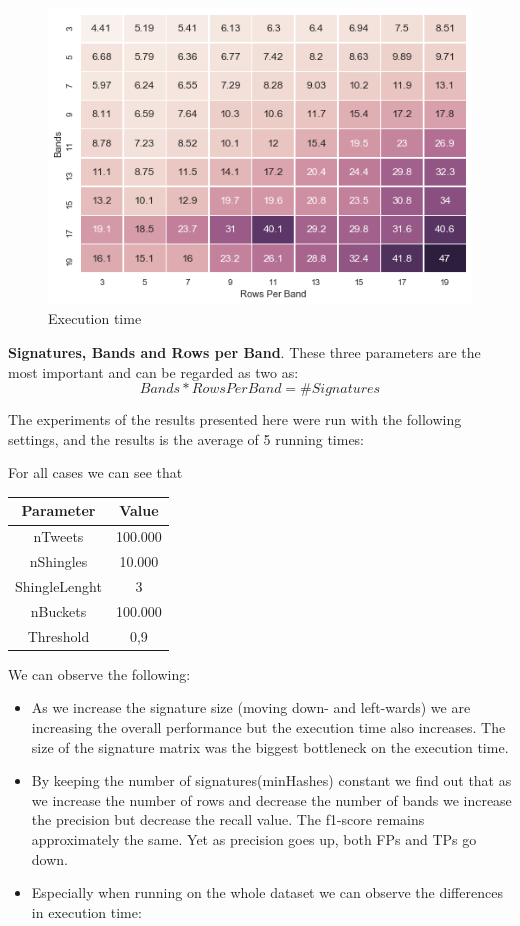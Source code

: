 \documentclass[12pt]{article}
\begin{document}
\begin{figure}[t]
\caption{Execution time}
\includegraphics[scale=0.7]{time.png}
\centering
\end{figure}


\textbf{Signatures, Bands and Rows per Band}. These three parameters are the most important and can be regarded as two as:
\[ Bands * RowsPerBand = \#Signatures\]

The experiments of the results presented here were run with the following settings, and the results is the average of 5 running times:

For all cases we can see that 
\begin{center}
 \begin{tabular}{||c |  c||}
 \hline
 Parameter & Value \\ [0.5ex]
 \hline\hline
nTweets & 100.000 \\
 \hline
nShingles & 10.000 \\
 \hline
ShingleLenght & 3 \\
 \hline
nBuckets & 100.000  \\
 \hline
Threshold & 0,9 \\
 \hline
\end{tabular}
\end{center}

We can observe the following:

\begin{itemize}
    \item As we increase the signature size (moving down- and left-wards) we are increasing the overall performance but the execution time also increases. 
The size of the signature matrix was the biggest bottleneck on the execution time.   
    \item By keeping the number of signatures(minHashes) constant we find out that as we increase the number of rows and decrease the number of bands we increase the precision but decrease the recall value. The f1-score remains approximately the same. Yet as precision goes up, both FPs and TPs go down. 
    \item Especially when running on the whole dataset we can observe the differences in execution time:   
    
  \end{itemize}
\end{document}
